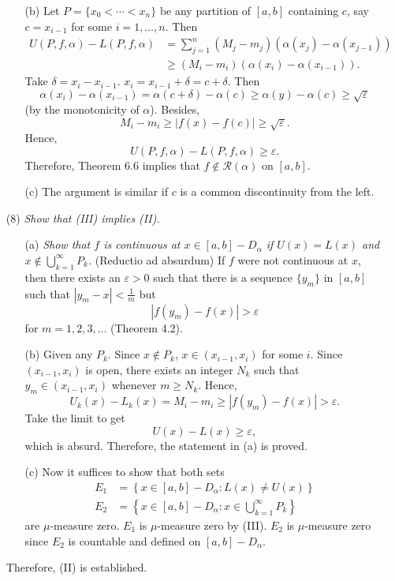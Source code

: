 \documentclass{article}
\begin{document}
\begin{enumerate}
\begin{enumerate}
  \item[(b)]
    Let $P = \{x_0 < \cdots < x_n \}$ be any partition of $[a,b]$ containing $c$,
    say $c = x_{i-1}$ for some $i = 1,\ldots,n$.
    Then
    \begin{align*}
      U(P,f,\alpha) - L(P,f,\alpha)
      &= \sum_{j=1}^{n} (M_j - m_j)(\alpha(x_j) - \alpha(x_{j-1})) \\
      &\geq (M_i - m_i)(\alpha(x_i) - \alpha(x_{i-1})).
    \end{align*}
    Take $\delta = x_i - x_{i-1}$. $x_i = x_{i-1}+\delta = c+\delta$.
    Then
    \[
      \alpha(x_i) - \alpha(x_{i-1})
      = \alpha(c+\delta) - \alpha(c)
      \geq \alpha(y) - \alpha(c)
      \geq \sqrt{\varepsilon}
    \]
    (by the monotonicity of $\alpha$).
    Besides,
    \[
      M_i - m_i \geq |f(x)-f(c)| \geq \sqrt{\varepsilon}.
    \]
    Hence,
    \[
      U(P,f,\alpha) - L(P,f,\alpha) \geq \varepsilon.
    \]
    Therefore,
    Theorem 6.6 implies that $f \not\in \mathscr{R}(\alpha)$ on $[a,b]$.

  \item[(c)]
    The argument is similar if $c$ is a common discontinuity from the left.
  \end{enumerate}

\item[(8)]
  \emph{Show that (III) implies (II).}
  \begin{enumerate}
  \item[(a)]
    \emph{Show that $f$ is continuous at $x \in [a,b] - D_{\alpha}$ if
    $U(x) = L(x)$ and $x \not\in \bigcup_{k=1}^{\infty} P_k$.}
    (Reductio ad absurdum)
    If $f$ were not continuous at $x$,
    then there exists an $\varepsilon > 0$ such that
    there is a sequence $\{ y_m \}$ in $[a,b]$
    such that $|y_m - x| < \frac{1}{m}$ but
    \[
      |f(y_m) - f(x)| > \varepsilon
    \]
    for $m = 1,2,3,\ldots$ (Theorem 4.2).

  \item[(b)]
    Given any $P_k$.
    Since $x \not \in P_k$, $x \in (x_{i-1},x_{i})$ for some $i$.
    Since $(x_{i-1},x_{i})$ is open,
    there exists an integer $N_k$ such that $y_m \in (x_{i-1},x_{i})$ whenever $m \geq N_k$.
    Hence,
    \[
      U_k(x) - L_k(x) = M_i - m_i \geq |f(y_m) - f(x)| > \varepsilon.
    \]
    Take the limit to get
    \[
      U(x) - L(x) \geq \varepsilon,
    \]
    which is absurd. Therefore, the statement in (a) is proved.

  \item[(c)]
    Now it suffices to show that both sets
    \begin{align*}
      E_1 &= \left\{ x \in [a,b] - D_{\alpha} : L(x) \neq U(x) \right\} \\
      E_2 &= \left\{ x \in [a,b] - D_{\alpha} : x \in \bigcup_{k=1}^{\infty} P_k \right\}
    \end{align*}
    are $\mu$-measure zero.
    $E_1$ is $\mu$-measure zero by (III).
    $E_2$ is $\mu$-measure zero since $E_2$ is countable and defined on $[a,b] - D_{\alpha}$.
  \end{enumerate}
  Therefore, (II) is established.


\end{enumerate}
\end{document}
